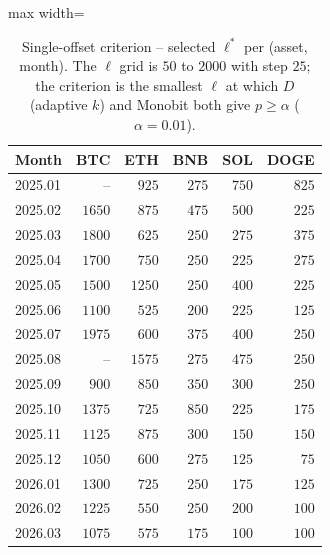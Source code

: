 \documentclass[11pt,titlepage,openany,oneside]{book}  %
\begin{document}
\begin{table}[!htbp]
  \caption[Single-offset criterion -- selected $\ell^*$]{Single-offset criterion -- selected $\ell^*$ per (asset, month). The $\ell$ grid is $50$ to $2000$ with step $25$; the criterion is the smallest $\ell$ at which $D$ (adaptive $k$) and Monobit both give $p \geq \alpha$ ($\alpha = 0.01$).}
  \label{tab:appendix-a1}
  \begin{center}
    \begin{adjustbox}{max width=\textwidth}
    \begin{tabular}{lrrrrr}
      \toprule
      Month   & BTC    & ETH    & BNB   & SOL   & DOGE  \\
      \midrule
      2025.01 & --     & $925$  & $275$ & $750$ & $825$ \\
      2025.02 & $1650$ & $875$  & $475$ & $500$ & $225$ \\
      2025.03 & $1800$ & $625$  & $250$ & $275$ & $375$ \\
      2025.04 & $1700$ & $750$  & $250$ & $225$ & $275$ \\
      2025.05 & $1500$ & $1250$ & $250$ & $400$ & $225$ \\
      2025.06 & $1100$ & $525$  & $200$ & $225$ & $125$ \\
      2025.07 & $1975$ & $600$  & $375$ & $400$ & $250$ \\
      2025.08 & --     & $1575$ & $275$ & $475$ & $250$ \\
      2025.09 & $900$  & $850$  & $350$ & $300$ & $250$ \\
      2025.10 & $1375$ & $725$  & $850$ & $225$ & $175$ \\
      2025.11 & $1125$ & $875$  & $300$ & $150$ & $150$ \\
      2025.12 & $1050$ & $600$  & $275$ & $125$ & $75$  \\
      2026.01 & $1300$ & $725$  & $250$ & $175$ & $125$ \\
      2026.02 & $1225$ & $550$  & $250$ & $200$ & $100$ \\
      2026.03 & $1075$ & $575$  & $175$ & $100$ & $100$ \\
      \bottomrule
    \end{tabular}
    \end{adjustbox}
  \end{center}
\end{table}
\end{document}
